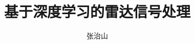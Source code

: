 \documentclass[twoside]{nputhesis}
\title[Radar Signal Process Based on Deep Learning]{基于深度学习的雷达信号处理}
\author[Zhishan Zhang]{张治山}
\begin{document}
\makecover
\frontmatter





\tableofcontents

\mainmatter







\backmatter



\Appendix



\Thanks



\Work


\statement
\end{document}
